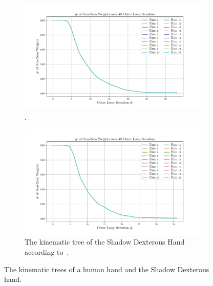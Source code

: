 \begin{figure}[!h]
	\centering
	\begin{subfigure}[b]{0.48\textwidth}
		\centering
		\includegraphics[width=\textwidth]{chapters/2-pose-estimation/fig/GNC-TLS-w-run-10-conv.pdf}
		\caption{.}
		\label{app:GNC-TLS-w-run-10-conv}
	\end{subfigure}
	\hfill
	\begin{subfigure}[b]{0.48\textwidth}
		\centering
		\includegraphics[width=\textwidth]{chapters/2-pose-estimation/fig/GNC-TLS-w-run-20-conv.pdf}
		\caption{The kinematic tree of the Shadow Dexterous Hand according to~\cite{robot-hand-kinematics}. \newline}
		\label{app:GNC-TLS-w-run-20-conv}
	\end{subfigure}
	\caption{The kinematic trees of a human hand and the Shadow Dexterous hand.}
	\label{app:GNC-TLS-w-run-10-20-conv}
\end{figure}
